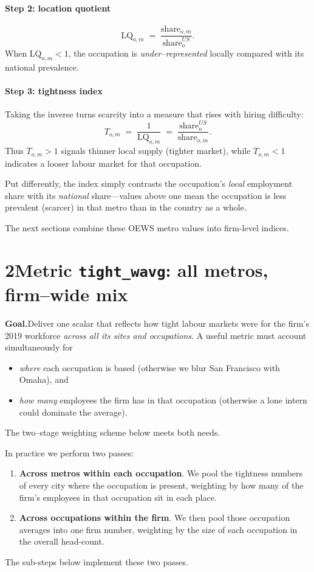 \documentclass[11pt]{article}
\begin{document}
\paragraph{Step 2: location quotient}
\[
  \text{LQ}_{o,m} \;=\; \frac{\text{share}_{o,m}}{\text{share}^{US}_{o}}.
\]
When \(\text{LQ}_{o,m}<1\), the occupation is \emph{under--represented}
locally compared with its national prevalence.

\paragraph{Step 3: tightness index}
Taking the inverse turns scarcity into a measure that rises with hiring
difficulty:
\[
  T_{o,m} \;=\; \frac{1}{\text{LQ}_{o,m}} \;=\;
  \frac{\text{share}^{US}_{o}}{\text{share}_{o,m}}.
\]
Thus \(T_{o,m}>1\) signals thinner local supply (tighter market), while
\(T_{o,m}<1\) indicates a looser labour market for that occupation.

\smallskip
Put differently, the index simply contrasts the occupation’s \emph{local}
employment share with its \emph{national} share—values above one mean the
occupation is less prevalent (scarcer) in that metro than in the country as a
whole.

\medskip

The next sections combine these OEWS metro values into firm-level
indices.

\section*{2\quad Metric \texttt{tight\_wavg}: all metros, firm--wide mix}

\textbf{Goal.}\;Deliver one scalar that reflects how tight labour markets
were for the firm’s 2019 workforce \emph{across all its sites and
occupations}.  A useful metric must account simultaneously for
\begin{itemize}
  \item \emph{where} each occupation is based (otherwise we blur San
        Francisco with Omaha), and
  \item \emph{how many} employees the firm has in that occupation
        (otherwise a lone intern could dominate the average).
\end{itemize}
The two–stage weighting scheme below meets both needs.

In practice we perform two passes:
\begin{enumerate}
  \item \textbf{Across metros within each occupation}.  We pool the
        tightness numbers of every city where the occupation is present,
        weighting by how many of the firm’s employees in that occupation
        sit in each place.
  \item \textbf{Across occupations within the firm}.  We then pool those
        occupation averages into one firm number, weighting by the size
        of each occupation in the overall head-count.
\end{enumerate}
The sub-steps below implement these two passes.
\end{document}
